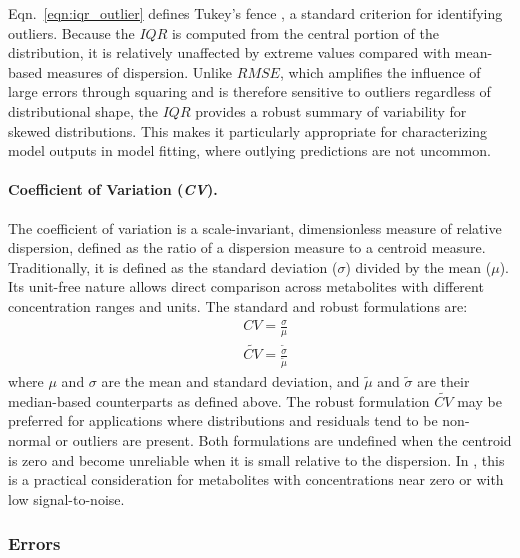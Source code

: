 Eqn.~\ref{eqn:iqr_outlier} defines Tukey's fence \cite{Tukey1977}, a standard criterion for identifying outliers. Because the $IQR$ is computed from the central portion of the distribution, it is relatively unaffected by extreme values compared with mean-based measures of dispersion. Unlike $RMSE$, which amplifies the influence of large errors through squaring and is therefore sensitive to outliers regardless of distributional shape, the $IQR$ provides a robust summary of variability for skewed distributions. This makes it particularly appropriate for characterizing \DL model outputs in model fitting, where outlying predictions are not uncommon.

\paragraph{Coefficient of Variation (\textit{CV}).}
The coefficient of variation is a scale-invariant, dimensionless measure of relative dispersion, defined as the ratio of a dispersion measure to a centroid measure. Traditionally, it is defined as the standard deviation ($\sigma$) divided by the mean ($\mu$). Its unit-free nature allows direct comparison across metabolites with different concentration ranges and units. The standard and robust formulations are:
\begin{subequations}
    \begin{align}
        &CV = \frac{\sigma}{\mu} \label{eqn:cv} \\ &\widetilde{CV} = \frac{\widetilde{\sigma}}{\widetilde{\mu}} \label{eqn:np cv}
    \end{align}
\end{subequations}
\noindent where $\mu$ and $\sigma$ are the mean and standard deviation, and $\widetilde{\mu}$ and $\widetilde{\sigma}$ are their median-based counterparts as defined above. The robust formulation 
$\widetilde{CV}$ may be preferred for \DL applications where distributions and residuals tend to be non-normal or outliers are present. Both formulations are undefined when the centroid is zero and become unreliable when it is small relative to the dispersion. In \MRS, this is a practical consideration for metabolites with concentrations near zero or with low signal-to-noise.

\subsubsection{Errors}\label{sec:Eval:subsec:error:subsubsection:errors}
